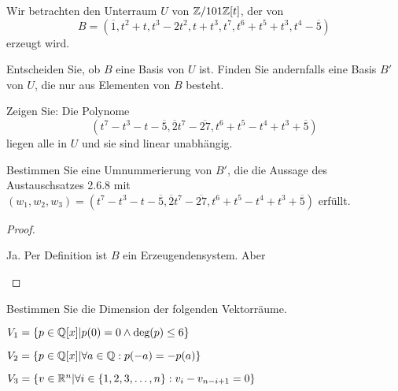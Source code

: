 \begin{Problem}
	Wir betrachten den Unterraum $U$ von $\mathbb{Z} / 101\mathbb{Z}[t]$, der von
	\[
	B=\left( \overline{1},t^2+t,t^3-2t^2,t+t^3,t^7,t^6+t^5+t^3,t^4-\overline{5} \right)\] erzeugt wird.
	\begin{parts}
		\item Entscheiden Sie, ob $B$ eine Basis von $U$ ist. Finden Sie andernfalls eine Basis $B'$ von $U$, die nur aus Elementen von $B$ besteht.
		\item Zeigen Sie: Die Polynome
			\[
				(t^7-t^3-t-\overline{5}, \overline{2}t^7-\overline{27},t^6+t^5-t^4+t^3+\overline{5})\] liegen alle in $U$ und sie sind linear unabhängig.
			\item Bestimmen Sie eine Umnummerierung von $B'$, die die Aussage des Austauschsatzes 2.6.8 mit $(w_1,w_2,w_3)=(t^7-t^3-t-\overline{5},\overline{2}t^7-\overline{27},t^6+t^5-t^4+t^3+\overline{5})$ erfüllt.
	\end{parts}
\end{Problem}
\begin{proof}
	\begin{parts}
	\item Ja. Per Definition ist $B$ ein Erzeugendensystem. Aber 
	\end{parts}
\end{proof}
\begin{Problem}
Bestimmen Sie die Dimension der folgenden Vektorräume.	
\begin{parts}
	\item $V_1=\left\{ p\in \mathbb{Q}[x]|p(0)=0\wedge \text{deg}(p)\le 6 \right\} $ 
	\item $V_2=\left\{ p\in \mathbb{Q}[x]|\forall a\in \mathbb{Q}:p(-a)=-p(a) \right\} $ 
	\item $V_3=\left\{ v\in \mathbb{R}^n|\forall i\in \left\{ 1,2,3,\dots, n \right\} :v_i-v_{n-i+1}=0 \right\} $
\end{parts}
\end{Problem}

